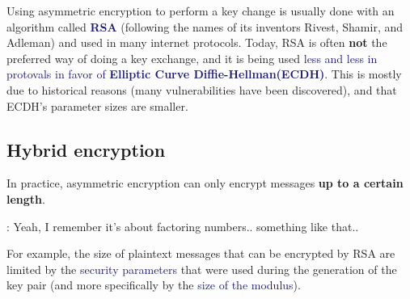 \documentclass[dvipsnames]{article}
\newcommand{\mycola}{MidnightBlue}
\newcommand{\cola}[1]{\textcolor{\mycola}{#1}}
\newcommand{\Cola}[1]{\textcolor{\mycola}{\textbf{#1}}}
\newcommand\uptodown[3][-o]{\draw[very thick,#1](#2.south) to [out=270,in=90] (#3.north);}
\newcommand\lefttoright[3][-latex]{\draw[very thick,#1](#2.east) to[out=0,in=180] (#3.west);}
\begin{document}
\begin{center}
\end{center}
Using asymmetric encryption to perform a key change is usually done with an
algorithm called \Cola{RSA} (following the names of its inventors Rivest,
Shamir, and Adleman) and used in many internet protocols. Today, RSA is often
\textbf{not} the preferred way of doing a key exchange, and it is being used
\cola{less and less in protovals in favor of \textbf{Elliptic Curve
    Diffie-Hellman(ECDH)}}. This is mostly due to historical reasons (many
vulnerabilities have been discovered), and that ECDH's parameter sizes are smaller.

\subsection{Hybrid encryption}

In practice, asymmetric encryption can only encrypt messages \textbf{up to a certain
  length}.
\begin{tcolorbox}
   : Yeah, I remember it's about factoring numbers.. something
  like that..  
\end{tcolorbox}
For example, the size of plaintext messages that can be encrypted by RSA are
limited by the \cola{security parameters} that were used during the generation
of the key pair (and more specifically by the \cola{size of the modulus}). 
\end{document}
